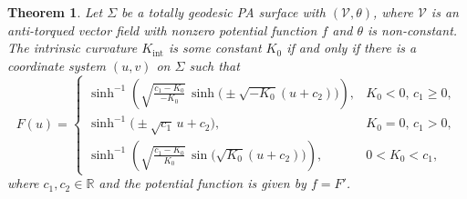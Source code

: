 \documentclass[10pt,a4paper]{amsart}
\newtheorem{theorem}{Theorem}
\def\r{\mathbb R}
\def\v{\mathcal V}
\begin{document}
\begin{theorem}\label{classtotgeo}
Let $\Sigma$ be a totally geodesic PA surface with $(\v,\theta)$, where $\v$ is an anti-torqued vector field with nonzero potential function $f$ and $\theta$ is non-constant. The intrinsic curvature $K_{\mathrm{int}}$ is some constant $K_0$ if and only if there is a coordinate system $(u,v)$ on $\Sigma$ such that 
\begin{equation}\label{ODEtg0}
F(u)=
\begin{cases}
\displaystyle
\sinh^{-1}\!\left(
\sqrt{\frac{c_1-K_0}{-K_0}}\,
\sinh\big(\pm\sqrt{-K_0}(u+c_2)\big)
\right) , & K_0<0, \, c_1\geq 0,\\[14pt]
\displaystyle
\sinh^{-1}\big(\pm\sqrt{c_1}\,u+c_2\big), & K_0=0, \, c_1>0,\\[10pt]
\displaystyle
\sinh^{-1}\!\left(
\sqrt{\frac{c_1-K_0}{K_0}}\,
\sin\big(\sqrt{K_0}(u+c_2)\big)
\right), & 0<K_0<c_1, 
\end{cases}
\end{equation}
where $c_1,c_2\in \r$  and the potential function is given by $f=F'$.
\end{theorem}
\end{document}
